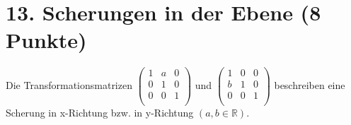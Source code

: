 \documentclass[11pt]{article}
\begin{document}
\section*{13. Scherungen in der Ebene (8 Punkte)}
Die Transformationsmatrizen
$\begin{pmatrix}
1 & a & 0 \\
0 & 1 & 0 \\
0 & 0 & 1 \\ 
\end{pmatrix}$
und
$\begin{pmatrix}
1 & 0 & 0 \\
b & 1 & 0 \\
0 & 0 & 1 \\
\end{pmatrix}$
beschreiben eine Scherung in x-Richtung bzw. in y-Richtung $(a, b \in \mathbb{R})$.
\end{document}
